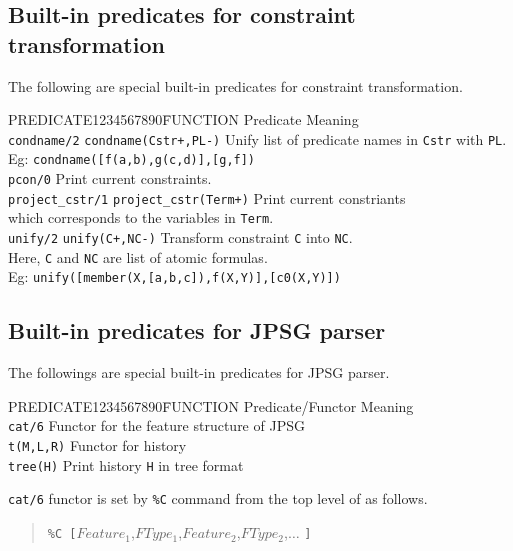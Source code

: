 \subsection{Built-in predicates for constraint transformation}
The following are special built-in predicates for constraint
transformation.

\begin{tabbing}
PREDICATE1234567890\= FUNCTION \kill
Predicate	\> Meaning\\
{\tt condname/2}	\> {\tt condname(Cstr+,PL-)} Unify list of
predicate names in {\tt Cstr} with {\tt PL}.\\
	\> Eg: {\tt condname([f(a,b),g(c,d)],[g,f])}\\
{\tt pcon/0}	\> Print current constraints.\\
{\tt project\_cstr/1} \> {\tt project\_cstr(Term+)} Print current
constriants\\
	which corresponds to the variables in {\tt Term}.\\
{\tt unify/2} \> {\tt unify(C+,NC-)} Transform constraint {\tt C} 
into {\tt NC}.\\
	\> Here, {\tt C} and {\tt NC} are list of atomic formulas. \\
	\> Eg: {\tt unify([member(X,[a,b,c]),f(X,Y)],[c0(X,Y)])}\\
\end{tabbing}

\subsection{Built-in predicates for JPSG parser}
The followings are special built-in predicates for JPSG parser.

\begin{tabbing}
PREDICATE1234567890\= FUNCTION \kill
Predicate/Functor	\> Meaning\\
{\tt cat/6} \> Functor for the feature structure of JPSG\\
{\tt t(M,L,R)} \>  Functor for history\\
{\tt tree(H)} \> Print history {\tt H} in tree format\\
\end{tabbing}

{\tt cat/6} functor is set by \verb+%C+ command from the top level of
\cuprolog as follows.

\begin{quote}
	{\tt \%C [}$Feature_{1}$,$FType_{1}$,$Feature_{2}$,$FType_{2}$,$\ldots$ {\tt]}
\end{quote}

